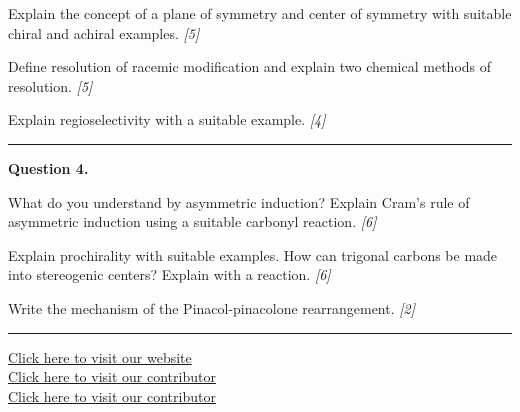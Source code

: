 \documentclass[11pt,a4paper]{article}
\newcommand{\pts}[1]{\hfill   \textit{[#1]}}
\begin{document}
\begin{parts}
  \item Explain the concept of a plane of symmetry and center of symmetry with suitable chiral and achiral examples. \pts{5}
  \item Define resolution of racemic modification and explain two chemical methods of resolution. \pts{5}
  \item Explain regioselectivity with a suitable example. \pts{4}
\end{parts}

\medskip\rule{\linewidth}{0.2pt}




\noindent   \textbf{Question 4.}

\begin{parts}
  \item What do you understand by asymmetric induction? Explain Cram's rule of asymmetric induction using a suitable carbonyl reaction. \pts{6}
  \item Explain prochirality with suitable examples. How can trigonal carbons be made into stereogenic centers? Explain with a reaction. \pts{6}
  \item Write the mechanism of the Pinacol-pinacolone rearrangement. \pts{2}
\end{parts}

\vfill
\rule{\linewidth}{0.4pt}

\begin{center}\small
  \href{https://bhu-exam.vercel.app/}{Click here to visit our website}\\[4pt]
  \href{https://me-aryan.vercel.app/}{Click here to visit our contributor}\\[4pt]
  \href{https://quashan-me.vercel.app/}{Click here to visit our contributor}
\end{center}
\end{document}
